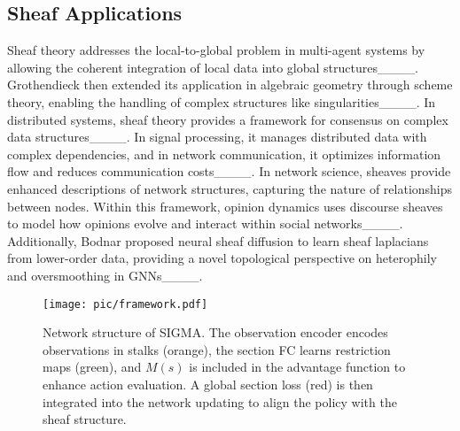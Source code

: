 \subsection{Sheaf Applications}
Sheaf theory addresses the local-to-global problem in multi-agent systems by allowing the coherent integration of local data into global structures____. Grothendieck then extended its application in algebraic geometry through scheme theory, enabling the handling of complex structures like singularities____. In distributed systems, sheaf theory provides a framework for consensus on complex data structures____. In signal processing, it manages distributed data with complex dependencies, and in network communication, it optimizes information flow and reduces communication costs____. In network science, sheaves provide enhanced descriptions of network structures, capturing the nature of relationships between nodes. Within this framework, opinion dynamics uses discourse sheaves to model how opinions evolve and interact within social networks____. Additionally, Bodnar proposed neural sheaf diffusion to learn sheaf laplacians from lower-order data, providing a novel topological perspective on heterophily and oversmoothing in GNNs____.


\begin{figure*}[t]
  \centering
  \texttt{[image: pic/framework.pdf]}
  \caption{Network structure of SIGMA. The observation encoder encodes observations in stalks (orange), the section FC learns restriction maps (green), and \(M(s)\) is included in the advantage function to enhance action evaluation. A global section loss (red) is then integrated into the network updating to align the policy with the sheaf structure.}
  \label{framework}
\end{figure*}